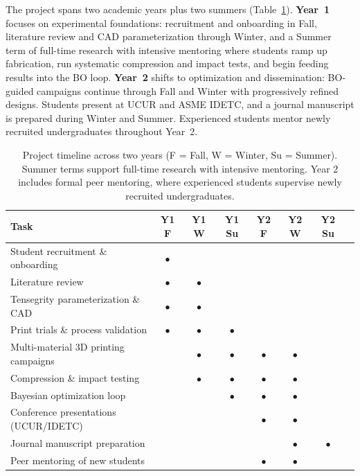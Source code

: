 \documentclass[11pt]{article}
\begin{document}
The project spans two academic years plus two summers (Table~\ref{tab:timeline}).
\textbf{Year~1} focuses on experimental foundations: recruitment and
onboarding in Fall, literature review and CAD parameterization through Winter, and a Summer term of full-time research with intensive
mentoring where students ramp up
fabrication, run systematic compression and impact
tests, and begin feeding results into the BO loop.
\textbf{Year~2} shifts to optimization and dissemination: BO-guided
campaigns continue through Fall and Winter with progressively refined designs.  Students present at UCUR
and ASME IDETC, and a journal manuscript is prepared during Winter
and Summer.  Experienced students mentor newly recruited
undergraduates throughout Year~2.

\begin{table}[ht]
\centering
\small
\begin{tabular}{@{}lccccccc@{}}
\toprule
\textbf{Task} & \textbf{Y1 F} & \textbf{Y1 W} & \textbf{Y1 Su} & \textbf{Y2 F} & \textbf{Y2 W} & \textbf{Y2 Su} \\
\midrule
Student recruitment \& onboarding    & \(\bullet\) &           &           &           &           &           \\
Literature review                     & \(\bullet\) & \(\bullet\) &           &           &           &           \\
Tensegrity parameterization \& CAD   & \(\bullet\) & \(\bullet\) &           &           &           &           \\
Print trials \& process validation   & \(\bullet\) & \(\bullet\) & \(\bullet\) &           &           &           \\
Multi-material 3D printing campaigns &             & \(\bullet\) & \(\bullet\) & \(\bullet\) & \(\bullet\) &           \\
Compression \& impact testing        &             & \(\bullet\) & \(\bullet\) & \(\bullet\) & \(\bullet\) &           \\
Bayesian optimization loop           &             &             & \(\bullet\) & \(\bullet\) & \(\bullet\) &           \\
Conference presentations (UCUR/IDETC)&             &             &             & \(\bullet\) & \(\bullet\) &           \\
Journal manuscript preparation       &             &             &             &             & \(\bullet\) & \(\bullet\) \\
Peer mentoring of new students       &             &             &             & \(\bullet\) & \(\bullet\) &           \\
\bottomrule
\end{tabular}
\caption{Project timeline across two years (F = Fall, W = Winter, Su = Summer).  Summer terms support full-time research with intensive mentoring. Year 2 includes formal peer mentoring, where experienced students supervise newly recruited undergraduates.}
\label{tab:timeline}
\end{table}
\end{document}
